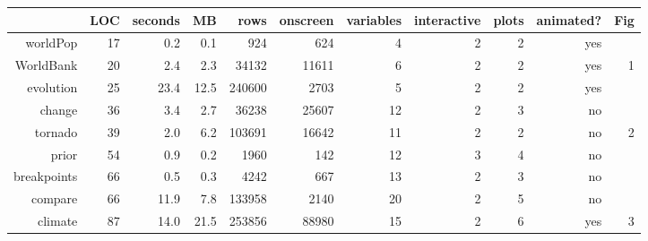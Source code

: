 \begin{tabular}{rrrrrrrrrrr}
  \hline
 & LOC & seconds & MB & rows & onscreen & variables & interactive & plots & animated? & Fig \\ 
  \hline
worldPop & 17 & 0.2 & 0.1 & 924 & 624 &  4 &  2 &  2 & yes &  \\ 
  WorldBank & 20 & 2.4 & 2.3 & 34132 & 11611 &  6 &  2 &  2 & yes &  1 \\ 
  evolution & 25 & 23.4 & 12.5 & 240600 & 2703 &  5 &  2 &  2 & yes &  \\ 
  change & 36 & 3.4 & 2.7 & 36238 & 25607 & 12 &  2 &  3 & no &  \\ 
  tornado & 39 & 2.0 & 6.2 & 103691 & 16642 & 11 &  2 &  2 & no &  2 \\ 
  prior & 54 & 0.9 & 0.2 & 1960 & 142 & 12 &  3 &  4 & no &  \\ 
  breakpoints & 66 & 0.5 & 0.3 & 4242 & 667 & 13 &  2 &  3 & no &  \\ 
  compare & 66 & 11.9 & 7.8 & 133958 & 2140 & 20 &  2 &  5 & no &  \\ 
  climate & 87 & 14.0 & 21.5 & 253856 & 88980 & 15 &  2 &  6 & yes &  3 \\ 
   \hline
\end{tabular}
